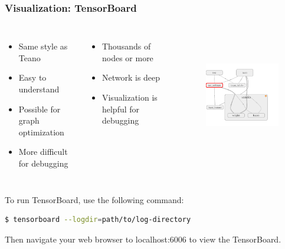 \begin{frame}[fragile]
  \MyLogo
  \frametitle{Visualization: TensorBoard}  

\vskip -25pt
\begin{columns}
\scriptsize{
\begin{itemize}
\item  Same style as Teano
\item  Easy to understand
\item  Possible for graph optimization
\item  More difficult for debugging
\end{itemize}

\medskip

\begin{itemize}
\item  Thousands of nodes or more 
\item  Network is deep
\item  Visualization is helpful for debugging 
\end{itemize}
}
%
\begin{figure}[htbp] 
   \includegraphics[height=2.2in]{figures/graphvisualization.png} 
\end{figure}
\end{columns}

To run TensorBoard, use the following command: 
\begin{lstlisting}[language=sh,numbers=none] 
$ tensorboard --logdir=path/to/log-directory
\end{lstlisting}
Then navigate your web browser to localhost:6006 to view the TensorBoard.

\end{frame}

%


